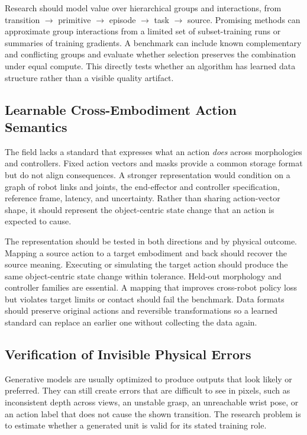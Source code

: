 Research should model value over hierarchical groups and interactions, from transition $\rightarrow$ primitive $\rightarrow$ episode $\rightarrow$ task $\rightarrow$ source.
Promising methods can approximate group interactions from a limited set of subset-training runs or summaries of training gradients.
A benchmark can include known complementary and conflicting groups and evaluate whether selection preserves the combination under equal compute.
This directly tests whether an algorithm has learned data structure rather than a visible quality artifact.

\subsection{Learnable Cross-Embodiment Action Semantics}

The field lacks a standard that expresses what an action \emph{does} across morphologies and controllers.
Fixed action vectors and masks provide a common storage format but do not align consequences.
A stronger representation would condition on a graph of robot links and joints, the end-effector and controller specification, reference frame, latency, and uncertainty.
Rather than sharing action-vector shape, it should represent the object-centric state change that an action is expected to cause.

The representation should be tested in both directions and by physical outcome.
Mapping a source action to a target embodiment and back should recover the source meaning.
Executing or simulating the target action should produce the same object-centric state change within tolerance.
Held-out morphology and controller families are essential.
A mapping that improves cross-robot policy loss but violates target limits or contact should fail the benchmark.
Data formats should preserve original actions and reversible transformations so a learned standard can replace an earlier one without collecting the data again.

\subsection{Verification of Invisible Physical Errors}

Generative models are usually optimized to produce outputs that look likely or preferred.
They can still create errors that are difficult to see in pixels, such as inconsistent depth across views, an unstable grasp, an unreachable wrist pose, or an action label that does not cause the shown transition.
The research problem is to estimate whether a generated unit is valid for its stated training role.

